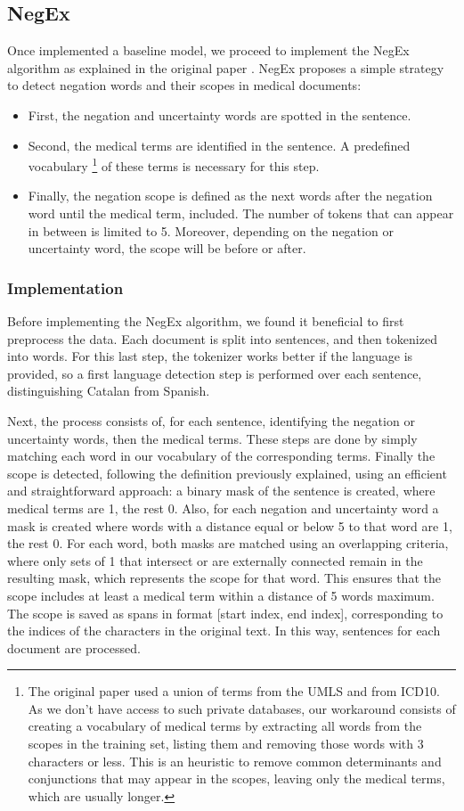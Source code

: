 \documentclass{article}
\begin{document}
\subsection*{NegEx}
Once implemented a baseline model, we proceed to implement the NegEx algorithm as explained in the original
paper \cite{negex}. NegEx proposes a simple strategy to detect negation words and their scopes in medical documents:
\begin{itemize}
	\item First, the negation and uncertainty words are spotted in the sentence. 
	\item Second, the medical terms are identified in the sentence. A predefined vocabulary \footnote{The original
	paper used a union of terms from the UMLS and from ICD10. As we don’t have access to such private databases,
	our workaround consists of creating a vocabulary of medical terms by extracting all words from the scopes in the
	training set, listing them and removing those words with 3 characters or less. This is an heuristic to remove common
	determinants and conjunctions that may appear in the scopes, leaving only the medical terms, which are usually
	longer.} of these terms is necessary for this step.
	\item Finally, the negation scope is defined as the next words after the negation word until the medical term,
	included. The number of tokens that can appear in between is limited to 5. Moreover, depending on the negation
	or uncertainty word, the scope will be before or after.
\end{itemize}

\subsubsection*{Implementation}
Before implementing the NegEx algorithm, we found it beneficial to first preprocess the data. Each document is split
into sentences, and then tokenized into words. For this last step, the tokenizer works better if the language is provided,
so a first language detection step is performed over each sentence, distinguishing Catalan from Spanish.

Next, the process consists of, for each sentence, identifying the negation or uncertainty words, then the medical terms.
These steps are done by simply matching each word in our vocabulary of the corresponding terms. Finally the scope is detected,
following the definition previously explained, using an efficient and straightforward approach: a binary mask of the sentence
is created, where medical terms are 1, the rest 0. Also, for each negation and uncertainty word a mask is created where words
with a distance equal or below 5 to that word are 1, the rest 0. For each word, both masks are matched using an overlapping
criteria, where only sets of 1 that intersect or are externally connected remain in the resulting mask, which represents the
scope for that word. This ensures that the scope includes at least a medical term within a distance of 5 words maximum.
The scope is saved as spans in format [start index, end index], corresponding to the indices of the characters in the original
text. In this way, sentences for each document are processed.
\end{document}
